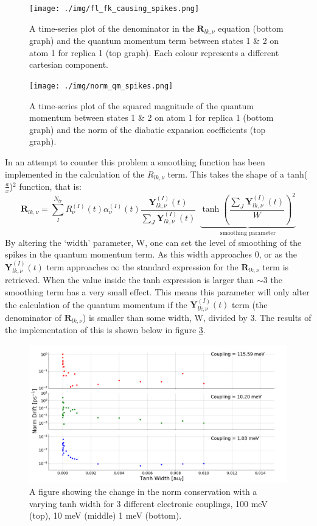 \begin{figure}[h]
  \texttt{[image: ./img/fl\_fk\_causing\_spikes.png]}
  \caption{\label{fig:flk_causing_spikes} A time-series plot of the denominator in the $\textbf{R}_{lk,\nu}$ equation (bottom graph) and the quantum momentum term between states 1 \& 2 on atom 1 for replica 1 (top graph). Each colour represents a different cartesian component.}
\end{figure}
\vfill
\begin{figure}[H]
  \texttt{[image: ./img/norm\_qm\_spikes.png]}
  \caption{\label{fig:norm_spikes} A time-series plot of the squared magnitude of the quantum momentum between states 1 \& 2 on atom 1 for replica 1 (bottom graph) and the norm of the diabatic expansion coefficients (top graph). }
\end{figure}
\newpage
\noindent In an attempt to counter this problem a smoothing function has been implemented in the calculation of the $R_{lk, \nu}$ term. This takes the shape of a tanh($\frac{a}{x}$)$^2$ function, that is:
\begin{equation}
  \textbf{R}_{lk, \nu} = \sum_{I}^{N_{tr}} R_{\nu}^{(I)}(t) \alpha_{\nu}^{(I)}(t)  \frac{\textbf{Y}^{(I)}_{lk, \nu}(t)}{\sum_{J} \textbf{Y}^{(I)}_{lk, \nu}(t)} \ \ \underbrace{\tanh\left(\frac{\sum_{J} \textbf{Y}^{(I)}_{lk, \nu}(t)}{W}\right)^2}_{\text{smoothing parameter}}
  \label{eq:tanh_smooth}
\end{equation}
By altering the `width' parameter, W, one can set the level of smoothing of the spikes in the quantum momentum term. As this width approaches 0, or as the $\textbf{Y}^{(I)}_{lk, \nu}(t)$ term approaches $\infty$ the standard expression for the $\textbf{R}_{lk, \nu}$ term is retrieved. When the value inside the tanh expression is larger than $\sim 3$ the smoothing term has a very small effect. This means this parameter will only alter the calculation of the quantum momentum if the $\textbf{Y}^{(I)}_{lk, \nu}(t)$ term (the denominator of $\textbf{R}_{lk, \nu}$) is smaller than some width, W, divided by 3. The results of the implementation of this is shown below in figure \ref{fig:tanh_result}.
\begin{figure}[H]
  \includegraphics[width=\textwidth]{./img/ManyScaling_NormDriftBetterVersion.png}
  \caption{\label{fig:tanh_result} A figure showing the change in the norm conservation with a varying tanh width for 3 different electronic couplings, 100 meV (top), 10 meV (middle) 1 meV (bottom).}
\end{figure}
